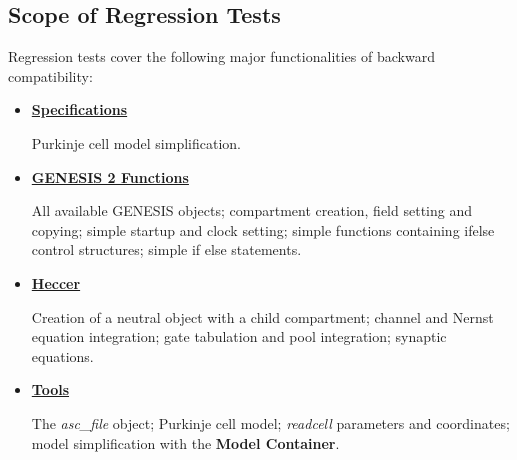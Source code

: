 \documentclass[12pt]{article}
\begin{document}
\subsection*{Scope of Regression Tests}

Regression tests cover the following major functionalities of backward compatibility:
\begin{itemize}
\item[]\href{http://neurospaces.sourceforge.net/neurospaces_project/ns-sli/tests/html/specifications/main.html}{\bf Specifications}

Purkinje cell model simplification.

\item[]\href{http://neurospaces.sourceforge.net/neurospaces_project/ns-sli/tests/html/specifications/core/main.html}{\bf GENESIS 2 Functions}

All available GENESIS objects; compartment creation, field setting and copying; simple startup and clock setting; simple functions containing ifelse control structures; simple if else statements.

\item[]\href{http://neurospaces.sourceforge.net/neurospaces_project/ns-sli/tests/html/specifications/heccer/main.html}{\bf Heccer}

Creation of a neutral object with a child compartment; channel and Nernst equation integration; gate tabulation and pool integration; synaptic equations.

\item[]\href{http://neurospaces.sourceforge.net/neurospaces_project/ns-sli/tests/html/specifications/tools/main.html}{\bf Tools}

The {\it asc\_file} object; Purkinje cell model; {\it readcell} parameters and coordinates; model simplification with the {\bf Model Container}.

\end{itemize}
\end{document}
